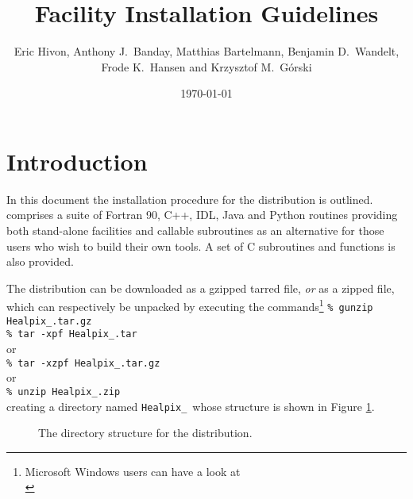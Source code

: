 \documentclass[12pt,twoside]{article}
\begin{document}
\title{\healpix Facility Installation Guidelines}
\author{Eric Hivon, Anthony J.~Banday, Matthias Bartelmann, Benjamin D.~Wandelt,
Frode K.~Hansen and Krzysztof M.~G\'orski}

\date{\today}

\frontpage
\tableofcontents
\newpage

\section{Introduction}

In this document the installation procedure for the \healpix
distribution is outlined. \healpix comprises a suite of Fortran 90, C++, 
IDL, Java and Python routines
providing both stand-alone facilities and callable subroutines as an alternative
for those users who wish to build their own tools.
A set of C subroutines and functions is also provided. 

The distribution can be downloaded as a gzipped tarred file, {\em or} as a zipped file,
which can respectively be unpacked by executing the commands\footnote{Microsoft Windows users can have a look at \\
} \hfill\newline
{\tt \% gunzip Healpix\_\hpxversion.tar.gz}\hfill\\
{\tt \% tar -xpf Healpix\_\hpxversion.tar}\hfill\\
or \hfill\\
{\tt \% tar -xzpf Healpix\_\hpxversion.tar.gz}\hfill\\
or \hfill\\
{\tt \% unzip Healpix\_\hpxversion.zip}\hfill\\
creating a directory named {\tt Healpix\_\hpxversion}\ whose structure is shown in Figure
\ref{fig:dirtree}.

\begin{figure}[!ht]
\caption[Directory structure]{%
\label{page:dirtree}
\label{fig:dirtree} %
The directory structure for the \healpix distribution. }
\end{figure}
\end{document}
